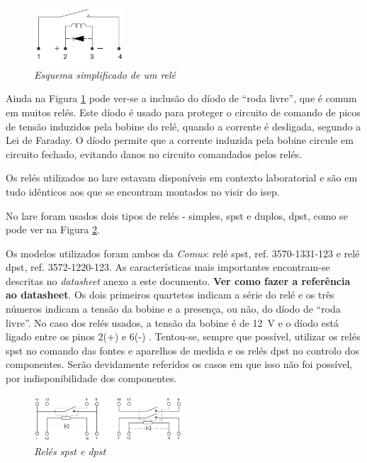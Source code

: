 \begin{figure}[hbtp]
    \centering
    \includegraphics[width=0.3\textwidth]{figures/esquematico_rele.png}
    \caption{\textit{Esquema simplificado de um relé \cite{DryRelay}}}
    \label{fig:esquematicoreles}
\end{figure}

Ainda na Figura \ref{fig:esquematicoreles} pode ver-se a inclusão do díodo de ``roda livre'', que é comum em muitos relés. Este díodo é usado para proteger o circuito de comando de picos de tensão induzidos pela bobine do relé, quando a corrente é desligada, segundo a Lei de Faraday. O díodo permite que a corrente induzida pela bobine circule em circuito fechado, evitando danos no circuito comandados pelos relés.

Os relés utilizados no \acrshort{lare} estavam disponíveis em contexto laboratorial e são em tudo idênticos aos que se encontram montados no \acrshort{visir}  do \acrshort{isep}.

No \acrshort{lare} foram usados dois tipos de relés - simples, \acrfull{spst} e duplos, \acrfull{dpst}, como se pode ver na Figura \ref {fig:reles}.

Os modelos utilizados foram ambos da \textit{Comus}: relé \acrshort{spst}, ref. 3570-1331-123 e relé \acrshort{dpst}, ref. 3572-1220-123. As características mais importantes encontram-se descritas no \textit{datasheet} anexo a este documento. \textbf{Ver como fazer a referência ao datasheet}. Os dois primeiros quartetos indicam a série do relé e os três números indicam a tensão da bobine e a presença, ou não, do díodo de ``roda livre''. No caso dos relés usados, a tensão da bobine é de \SI{12}{\volt} e o díodo está ligado entre os pinos 2(+) e 6(-) \cite{DryRelay}. Tentou-se, sempre que possível, utilizar os relés \acrshort{spst} no comando das fontes e aparelhos de medida e os relés \acrshort{dpst} no controlo dos componentes. Serão devidamente referidos os casos em que isso não foi possível, por indisponibilidade dos componentes.

\begin{figure}[hbtp]
    \centering
    \includegraphics[width=0.5\textwidth]{figures/reles.png}
    \caption{\textit{Relés \acrshort{spst} e \acrshort{dpst}} \cite{DryRelay}}
    \label{fig:reles}
\end{figure}

